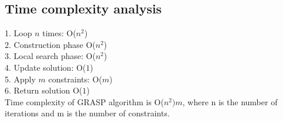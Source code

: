 \documentclass[12pt]{article}
\begin{document}
\subsection{Time complexity analysis}

1. Loop $n$ times: O($n^2$)\\
2. Construction phase O($n^2$)\\
3. Local search phase: O($n^2$)\\
4. Update solution: O($1$)\\
5. Apply $m$ constraints: O($m$)\\
6. Return solution O($1$)\\

Time complexity of GRASP algorithm is O($n^2)m$, where n is the number of iterations and m is the number of constraints.

 
\end{document}
